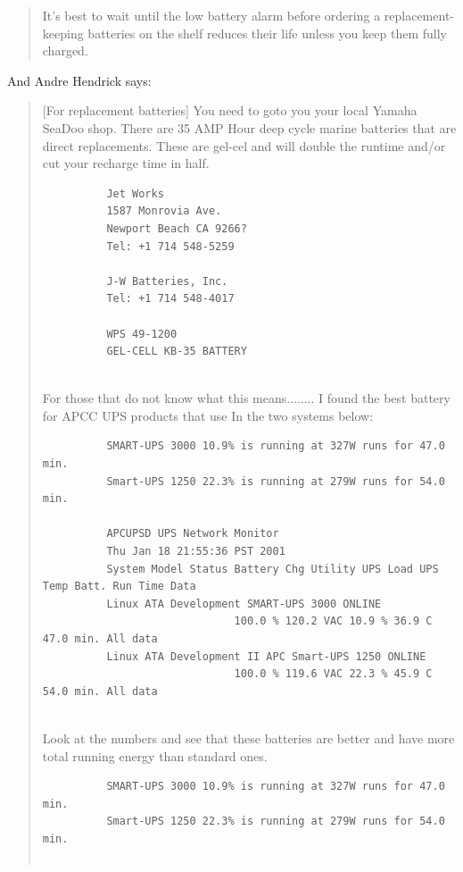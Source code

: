 {{{{{{\begin{quote}
It's best to wait until the low battery alarm before ordering a
replacement-keeping batteries on the shelf reduces their life unless you keep
them fully charged. 
\end{quote}

And Andre Hendrick says:  

\begin{quote}

[For replacement batteries] You need to goto you your local Yamaha SeaDoo
shop. There are 35 AMP Hour deep cycle marine batteries that are direct
replacements. These are gel-cel and will double the runtime and/or cut your
recharge time in half.  

\footnotesize
\begin{verbatim}
          Jet Works
          1587 Monrovia Ave.
          Newport Beach CA 9266?
          Tel: +1 714 548-5259
          
          J-W Batteries, Inc.
          Tel: +1 714 548-4017
          
          WPS 49-1200
          GEL-CELL KB-35 BATTERY
     
\end{verbatim}
\normalsize

For those that do not know what this means........ I found the best battery
for APCC UPS products that use In the two systems below:  

\footnotesize
\begin{verbatim}
          SMART-UPS 3000 10.9% is running at 327W runs for 47.0 min.
          Smart-UPS 1250 22.3% is running at 279W runs for 54.0 min.
          
          APCUPSD UPS Network Monitor
          Thu Jan 18 21:55:36 PST 2001
          System Model Status Battery Chg Utility UPS Load UPS Temp Batt. Run Time Data
          Linux ATA Development SMART-UPS 3000 ONLINE
                              100.0 % 120.2 VAC 10.9 % 36.9 C 47.0 min. All data
          Linux ATA Development II APC Smart-UPS 1250 ONLINE
                              100.0 % 119.6 VAC 22.3 % 45.9 C 54.0 min. All data
     
\end{verbatim}
\normalsize

Look at the numbers and see that these batteries are better and have more
total running energy than standard ones.  

\footnotesize
\begin{verbatim}
          SMART-UPS 3000 10.9% is running at 327W runs for 47.0 min.
          Smart-UPS 1250 22.3% is running at 279W runs for 54.0 min.
          

\end{verbatim}
\end{quote}}}}}}}
